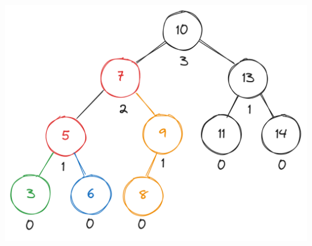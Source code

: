 \begin{minipage}[t]{.5\textwidth}
    \vspace{0pt}
    \centering
    \includegraphics[width=\linewidth]{HWs//HW7//figures/2_2.png}
\end{minipage}

